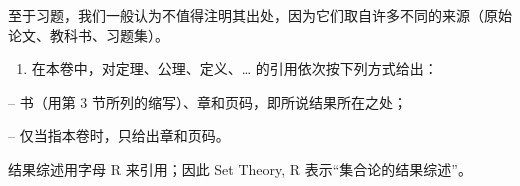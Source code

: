 至于习题，我们一般认为不值得注明其出处，因为它们取自许多不同的来源（原始论文、教科书、习题集）。

\begin{enumerate}
\def\labelenumi{\arabic{enumi}.}
\setcounter{enumi}{10}
\tightlist
\item
  在本卷中，对定理、公理、定义、\ldots{} 的引用依次按下列方式给出：
\end{enumerate}

-- 书（用第 3 节所列的缩写）、章和页码，即所说结果所在之处；

-- 仅当指本卷时，只给出章和页码。

结果综述用字母 R 来引用；因此 Set Theory, R 表示“集合论的结果综述”。
